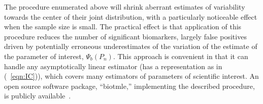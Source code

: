 The procedure enumerated above will shrink aberrant estimates of variability
towards the center of their joint distribution, with a particularly noticeable
effect when the sample size is small. The practical effect is that application
of this procedure reduces the number of significant biomarkers, largely false
positives driven by potentially erroneous underestimates of the variation of the
estimate of the parameter of interest, $\Psi_b(P_n)$. This approach is
convenient in that it can handle any asymptotically linear estimator (has a
representation as in (~\ref{eqn:IC})), which covers many estimators of
parameters of scientific interest. An open source software package, ``biotmle,''
implementing the described procedure, is publicly
available~\cite{hejazi2017biotmle}.
